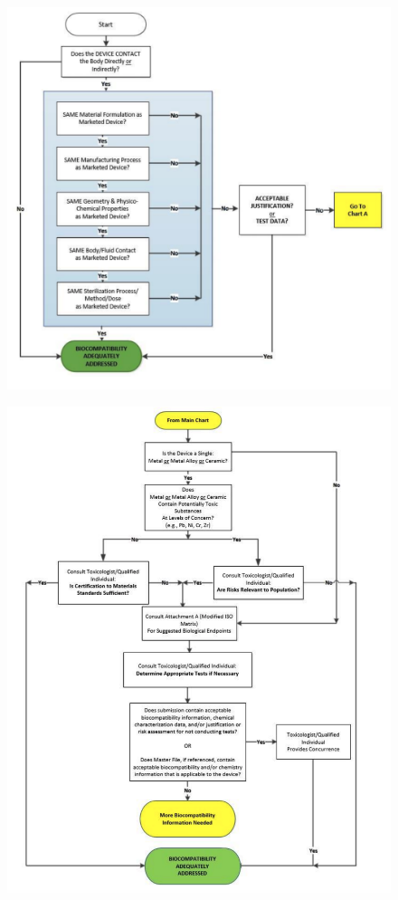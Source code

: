 \documentclass{Configuration_Files/PoliMi3i_thesis}
\begin{document}
\begin{figure}[H]
	\includegraphics[scale=0.4]{figure1_fda.png}
	\centering
\end{figure}
\begin{figure}[H]

	\includegraphics[scale=0.3]{figure2_fda.png}
	\centering
\end{figure}
\end{document}
